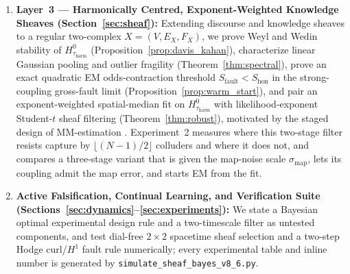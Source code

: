 \documentclass[11pt,a4paper]{article}
\theoremstyle{definition}
\theoremstyle{remark}
\begin{document}
\begin{enumerate}[leftmargin=1.8em]
  \item \textbf{Layer~3 --- Harmonically Centred, Exponent-Weighted Knowledge Sheaves (Section~\ref{sec:sheaf}):} Extending discourse and knowledge sheaves \cite{hansen2019toward,hansen2021opinion,gebhart2023knowledge} to a regular two-complex $X = (V, E_X, F_X)$, we prove Weyl and Wedin stability of $H^0_{\tau_{\mathrm{harm}}}$ \cite{weyl1912asymptotische,wedin1972perturbation} (Proposition~\ref{prop:davis_kahan}), characterize linear Gaussian pooling and outlier fragility (Theorem~\ref{thm:spectral}), prove an exact quadratic EM odds-contraction threshold $S_{\mathrm{fault}} < S_{\mathrm{hon}}$ in the strong-coupling gross-fault limit (Proposition~\ref{prop:warm_start}), and pair an exponent-weighted spatial-median fit on $H^0_{\tau_{\mathrm{harm}}}$ \cite{weiszfeld1937point,lopuhaa1991breakdown} with likelihood-exponent Student-$t$ sheaf filtering \cite{liu1995ml,holmes2017assigning} (Theorem~\ref{thm:robust}), motivated by the staged design of MM-estimation \cite{yohai1987high}. Experiment~2 measures where this two-stage filter resists capture by $\lfloor(N-1)/2\rfloor$ colluders and where it does not, and compares a three-stage variant that is given the map-noise scale $\sigma_{\mathrm{map}}$, lets its coupling admit the map error, and starts EM from the fit.
  \item \textbf{Active Falsification, Continual Learning, and Verification Suite (Sections~\ref{sec:dynamics}--\ref{sec:experiments}):} We state a Bayesian optimal experimental design rule \cite{lindley1956measure,houlsby2011bayesian} and a two-timescale filter as untested components, and test dial-free $2 \times 2$ spacetime sheaf selection and a two-step Hodge curl/$H^1$ fault rule numerically; every experimental table and inline number is generated by \texttt{simulate\_sheaf\_bayes\_v8\_6.py}.
\end{enumerate}
\end{document}

